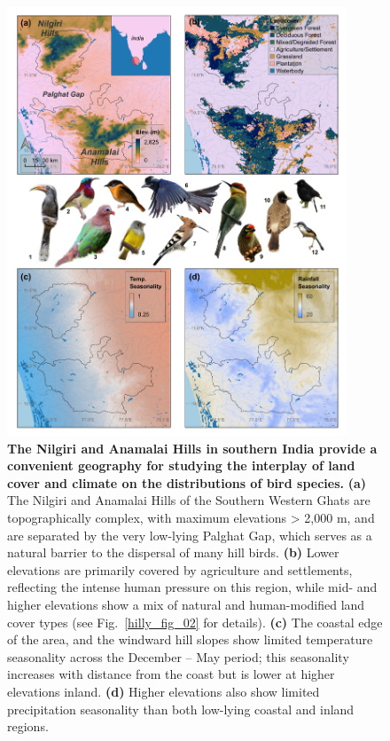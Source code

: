 \begin{figure}[h!]
    \centering
    \includegraphics[width=0.9\textwidth]{figures/hillybirds/fig_01.png}
    \caption{
        \textbf{The Nilgiri and Anamalai Hills in southern India provide a convenient geography for studying the interplay of land cover and climate on the distributions of bird species.}
        \textbf{(a)} The Nilgiri and Anamalai Hills of the Southern Western Ghats are topographically complex, with maximum elevations > 2,000 m, and are separated by the very low-lying Palghat Gap, which serves as a natural barrier to the dispersal of many hill birds. 
        \textbf{(b)} Lower elevations are primarily covered by agriculture and settlements, reflecting the intense human pressure on this region, while mid- and higher elevations show a mix of natural and human-modified land cover types (see Fig.~\ref{hilly_fig_02} for details). 
        \textbf{(c)} The coastal edge of the area, and the windward hill slopes show limited temperature seasonality across the December -- May period; this seasonality increases with distance from the coast but is lower at higher elevations inland. 
        \textbf{(d)} Higher elevations also show limited precipitation seasonality than both low-lying coastal and inland regions. 
}
\end{figure}

